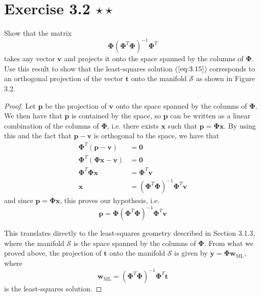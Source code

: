 \section*{Exercise 3.2 $\star \star$}
Show that the matrix 
\begin{equation}\label{eq:3.103}\tag{3.103}
    \mathbf{\Phi}(\mathbf{\Phi}^T\mathbf{\Phi})^{-1}\mathbf{\Phi}^T
\end{equation}
takes any vector $\mathbf{v}$ and projects it onto the space spanned by the columns
of $\mathbf{\Phi}$. Use this result to show that the least-squares solution 
($\ref{eq:3.15}$) corresponds to an orthogonal projection of the vector $\mathbf{t}$ onto
the manifold $\mathcal{S}$ as shown in Figure 3.2.

\vspace{1em}

\begin{proof}
    Let $\mathbf{p}$ be the projection of $\mathbf{v}$ onto the space spanned by the
    columns of $\mathbf{\Phi}$. We then have that $\mathbf{p}$ is contained by
    the space, so $\mathbf{p}$ can be written as a linear combination
    of the columns of $\mathbf{\Phi}$, i.e. there exists $\mathbf{x}$
    such that  $\mathbf{p} = \mathbf{\Phi}\mathbf{x}$. By using this
    and the fact that $\mathbf{p} - \mathbf{v}$ is orthogonal
    to the space, we have that
    \begin{align*}
        \mathbf{\Phi}^T(\mathbf{p} - \mathbf{v}) &= \mathbf{0} \\
        \mathbf{\Phi}^T(\mathbf{\Phi}\mathbf{x} - \mathbf{v}) &= \mathbf{0} \\
        \mathbf{\Phi}^T\mathbf{\Phi}\mathbf{x} &= \mathbf{\Phi}^T\mathbf{v} \\
        \mathbf{x} &= (\mathbf{\Phi}^T\mathbf{\Phi})^{-1}\mathbf{\Phi}^T\mathbf{v}
    \end{align*}
    and since $\mathbf{p} = \mathbf{\Phi}\mathbf{x}$, this proves our hypothesis,
    i.e. 
    \[
        \mathbf{p} = \mathbf{\Phi}(\mathbf{\Phi}^T\mathbf{\Phi})^{-1}\mathbf{\Phi}^T\mathbf{v}
    \] 

    This translates directly to the least-squares geometry described 
    in Section 3.1.3, where the manifold $\mathcal{S}$ is the space spanned
    by the columns of $\mathbf{\Phi}$. From what we proved above,
    the projection of $\mathbf{t}$ onto the manifold $\mathcal{S}$ 
    is given by $\mathbf{y} = \mathbf{\Phi}\mathbf{w}_{\text{ML}}$,
    where 
    \begin{equation}\label{eq:3.15}\tag{3.15}
        \mathbf{w}_{\text{ML}} = (\mathbf{\Phi}^T \mathbf{\Phi})^{-1} \mathbf{\Phi}^T \mathbf{t}
    \end{equation}
    is the least-squares solution.
\end{proof}

